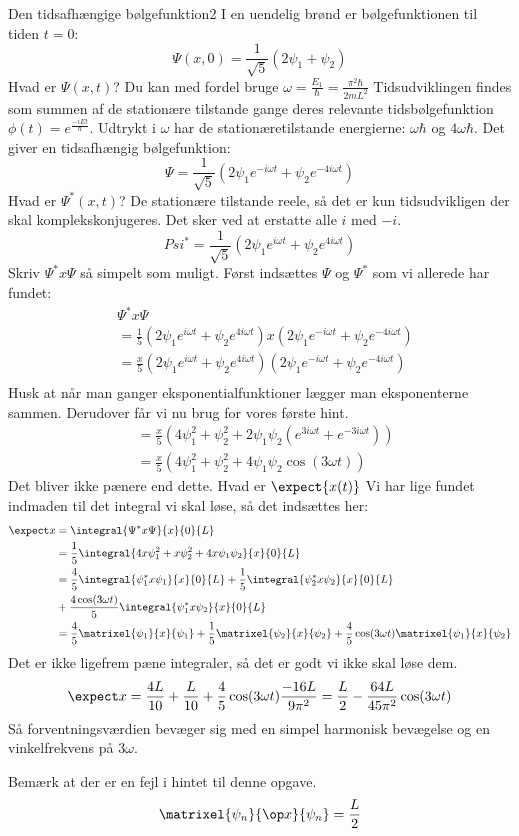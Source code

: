 \begin{opgave}{Den tidsafhængige bølgefunktion}{2}
I en uendelig brønd er bølgefunktionen til tiden $t=0$:
$$
\Psi(x,0) = \frac{1}{\sqrt{5}}(2\psi_1+\psi_2)
$$
\opg Hvad er $\Psi(x,t)$? Du kan med fordel bruge $\omega = \frac{E_1}{\hbar} = \frac{\pi^2\hbar}{2mL^2}$
Tidsudviklingen findes som summen af de stationære tilstande gange deres relevante tidsbølgefunktion $\phi(t) = e^{\frac{-iEt}{\hbar}}$. Udtrykt i $\omega$ har de stationæretilstande energierne: $\omega\hbar$ og $4\omega \hbar$. Det giver en tidsafhængig bølgefunktion:
$$
\Psi = \frac{1}{\sqrt{5}}(2\psi_1e^{-i\omega t}+\psi_2e^{-4i\omega t})
$$
\opg Hvad er $\Psi^*(x,t)$?
De stationære tilstande reele, så det er kun tidsudvikligen der skal komplekskonjugeres. Det sker ved at erstatte alle $i$ med $-i$.
$$
Psi^* = \frac{1}{\sqrt{5}}(2\psi_1e^{i\omega t}+\psi_2e^{4i\omega t})
$$
\opg Skriv $\Psi^*x\Psi$ så simpelt som muligt.
Først indsættes $\Psi$ og $\Psi^*$ som vi allerede har fundet:
\begin{align*}
    &\Psi^*x\Psi\\
    &= \frac{1}{5}(2\psi_1e^{i\omega t}+\psi_2e^{4i\omega t}) x (2\psi_1e^{-i\omega t}+\psi_2e^{-4i\omega t})\\
    &= \frac{x}{5}(2\psi_1e^{i\omega t}+\psi_2e^{4i\omega t})(2\psi_1e^{-i\omega t}+\psi_2e^{-4i\omega t})\\
\end{align*}
Husk at når man ganger eksponentialfunktioner lægger man eksponenterne sammen. Derudover får vi nu brug for vores første hint.
\begin{align*}
    &= \frac{x}{5}(4\psi_1^2+\psi_2^2+2\psi_1\psi_2(e^{3i\omega t}+e^{-3i\omega t}))\\
    &=\frac{x}{5}(4\psi_1^2+\psi_2^2+4\psi_1\psi_2\cos(3\omega t))
\end{align*}
Det bliver ikke pænere end dette.
\opg Hvad er $\expect{x(t)}$
Vi har lige fundet indmaden til det integral vi skal løse, så det indsættes her:
\begin{align*}
    \expect x &= \integral{\Psi^*x\Psi}{x}{0}{L}\\
    &= \frac{1}{5}\integral{4x\psi_1^2+x\psi_2^2+4x\psi_1\psi_2}{x}{0}{L}\\
    &= \frac{4}{5}\integral{\psi_1^*x\psi_1}{x}{0}{L}+\frac{1}{5}\integral{\psi_2^*x\psi_2}{x}{0}{L}\\
    &+\frac{4\cos(3\omega t)}{5}\integral{\psi_1^*x\psi_2}{x}{0}{L}\\
    &=\frac{4}{5}\matrixel{\psi_1}{x}{\psi_1}+\frac{1}{5}\matrixel{\psi_2}{x}{\psi_2}+\frac{4}{5}\cos(3\omega t)\matrixel{\psi_1}{x}{\psi_2}
\end{align*}
Det er ikke ligefrem pæne integraler, så det er godt vi ikke skal løse dem.
$$
\expect x = \frac{4L}{10}+\frac{L}{10}+\frac{4}{5}\cos(3\omega t)\frac{-16L}{9\pi^2}=\frac{L}{2}-\frac{64L}{45\pi^2}\cos(3\omega t)
$$
Så forventningsværdien bevæger sig med en simpel harmonisk bevægelse og en vinkelfrekvens på $3\omega$. 

Bemærk at der er en fejl i hintet til denne opgave.
$$
\matrixel{\psi_n}{\op x}{\psi_n} = \frac{L}{2}
$$
\end{opgave}
